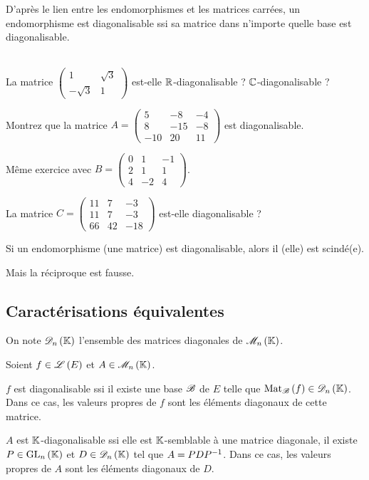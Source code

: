D'après le lien entre les endomorphismes et les matrices carrées, un endomorphisme est diagonalisable ssi sa matrice dans n'importe quelle base est diagonalisable.

\begin{exo}~\\
La matrice \(\begin{pmatrix}
1 & \sqrt{3} \\
-\sqrt{3} & 1
\end{pmatrix}\) est-elle \(\mathbb{R}\)-diagonalisable ? \(\mathbb{C}\)-diagonalisable ?
\end{exo}

\begin{exo}
Montrez que la matrice \(A=\begin{pmatrix}
5 & -8 & -4 \\
8 & -15 & -8 \\
-10 & 20 & 11
\end{pmatrix}\) est diagonalisable.
\end{exo}

\begin{exo}
Même exercice avec \(B=\begin{pmatrix}
0 & 1 & -1 \\
2 & 1 & 1 \\
4 & -2 & 4
\end{pmatrix}\).
\end{exo}

\begin{exo}
La matrice \(C=\begin{pmatrix}
11 & 7 & -3 \\
11 & 7 & -3 \\
66 & 42 & -18
\end{pmatrix}\) est-elle diagonalisable ?
\end{exo}

\begin{prop}
Si un endomorphisme (une matrice) est diagonalisable, alors il (elle) est scindé(e).
\end{prop}

Mais la réciproque est fausse.

\subsection{Caractérisations équivalentes}

On note \(\diago{n}\) l'ensemble des matrices diagonales de \(\M{n}\).

\begin{prop}
Soient \(f\in\mathscr{L}\left(E\right)\) et \(A\in\M{n}\).

\(f\) est diagonalisable ssi il existe une base \(\mathscr{B}\) de \(E\) telle que \(\Mat{f}\in\diago{n}\). Dans ce cas, les valeurs propres de \(f\) sont les éléments diagonaux de cette matrice.

\(A\) est \(\mathbb{K}\)-diagonalisable ssi elle est \(\mathbb{K}\)-semblable à une matrice diagonale, \ie il existe \(P\in\GL{n}\) et \(D\in\diago{n}\) tel que \(A=PDP^{-1}\). Dans ce cas, les valeurs propres de \(A\) sont les éléments diagonaux de \(D\).
\end{prop}


